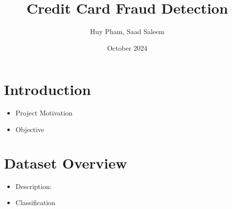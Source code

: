 \documentclass[12pt, letterpaper]{article}
\title{Credit Card Fraud Detection}
\author{Huy Pham, Saad Saleem}
\date{October 2024}
\begin{document}
\maketitle

\section{Introduction}
    \begin{itemize}
        \item Project Motivation
        \item Objective
 
    \end{itemize}
\section{Dataset Overview}
    \begin{itemize}
        \item Description:
        \item Classification
    \end{itemize}


    
\end{document}
